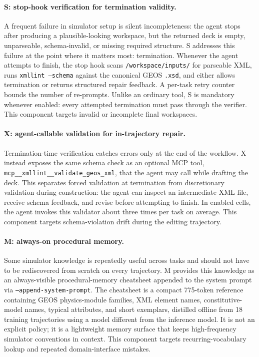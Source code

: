 \documentclass{article}
\begin{document}
\paragraph{S: stop-hook verification for termination validity.}
A frequent failure in simulator setup is silent incompleteness: the agent stops after producing a plausible-looking workspace, but the returned deck is empty, unparseable, schema-invalid, or missing required structure. 
S addresses this failure at the point where it matters most: termination. 
Whenever the agent attempts to finish, the stop hook scans \texttt{/workspace/inputs/} for parseable XML, runs \texttt{xmllint --schema} against the canonical GEOS \texttt{.xsd}, and either allows termination or returns structured repair feedback. 
A per-task retry counter bounds the number of re-prompts. 
Unlike an ordinary tool, S is mandatory whenever enabled: every attempted termination must pass through the verifier. 
This component targets invalid or incomplete final workspaces.

\paragraph{X: agent-callable validation for in-trajectory repair.}
Termination-time verification catches errors only at the end of the workflow. 
X instead exposes the same schema check as an optional MCP tool, \texttt{mcp\_\_xmllint\_\_validate\_geos\_xml}, that the agent may call while drafting the deck. 
This separates forced validation at termination from discretionary validation during construction: the agent can inspect an intermediate XML file, receive schema feedback, and revise before attempting to finish. 
In enabled cells, the agent invokes this validator about three times per task on average. 
This component targets schema-violation drift during the editing trajectory.

\paragraph{M: always-on procedural memory.}
Some simulator knowledge is repeatedly useful across tasks and should not have to be rediscovered from scratch on every trajectory. 
M provides this knowledge as an always-visible procedural-memory cheatsheet appended to the system prompt via \texttt{--append-system-prompt}. 
The cheatsheet is a compact 775-token reference containing GEOS physics-module families, XML element names, constitutive-model names, typical attributes, and short exemplars, distilled offline from 18 training trajectories using a model different from the inference model. 
It is not an explicit policy; it is a lightweight memory surface that keeps high-frequency simulator conventions in context. 
This component targets recurring-vocabulary lookup and repeated domain-interface mistakes.
\end{document}
